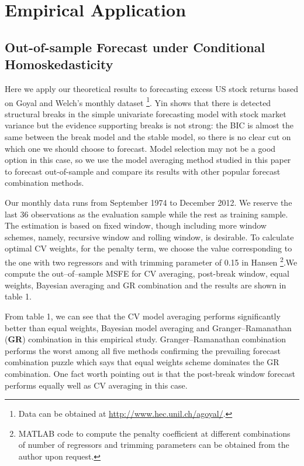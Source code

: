 \section{Empirical Application}
\subsection{Out-of-sample Forecast under Conditional Homoskedasticity}
Here we apply our theoretical results to forecasting excess US stock returns based on Goyal and Welch's \cite{goyal_welch_RFS2008} monthly dataset \footnote{Data can be obtained at \url{http://www.hec.unil.ch/agoyal/}.}. Yin \cite{yin2012} shows that there is detected structural breaks in the simple univariate forecasting model with stock market variance but the evidence supporting breaks is not strong: the BIC is almost the same between the break model and the stable model, so there is no clear cut on which one we should choose to forecast. Model selection may not be a good option in this case, so we use the model averaging method studied in this paper to forecast out-of-sample and compare its results with other popular forecast combination methods.

Our monthly data runs from September 1974 to December 2012. We reserve the last 36 observations as the evaluation sample while the rest as training sample. The estimation is based on fixed window, though including more window schemes, namely, recursive window and rolling window, is desirable. To calculate optimal CV weights, for the penalty term, we choose the value corresponding to the one with two regressors and with trimming parameter of 0.15 in Hansen \cite{hansen2009averaging} \footnote{MATLAB code to compute the penalty coefficient at different combinations of number of regressors and trimming parameters can be obtained from the author upon request.}.We compute the out--of--sample MSFE for CV averaging, post-break window, equal weights, Bayesian averaging and GR combination and the results are shown in table 1.

From table 1, we can see that the CV model averaging performs significantly better than equal weights, Bayesian model averaging and Granger--Ramanathan (\textbf{GR}) combination in this empirical study. Granger--Ramanathan combination performs the worst among all five methods confirming the prevailing forecast combination puzzle which says that equal weights scheme dominates the GR combination. One fact worth pointing out is that the post-break window forecast performs equally well as CV averaging in this case. 